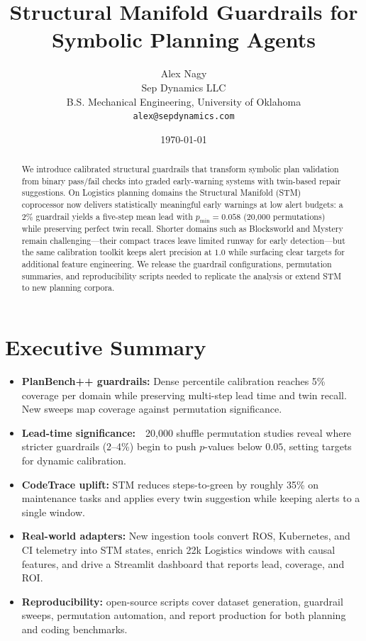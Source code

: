 \documentclass[11pt]{article}
\title{Structural Manifold Guardrails for Symbolic Planning Agents}
\author{Alex Nagy\\Sep Dynamics LLC\\B.S. Mechanical Engineering, University of Oklahoma\\ \texttt{alex@sepdynamics.com}}
\date{\today}
\begin{document}
\maketitle

\begin{abstract}
We introduce calibrated structural guardrails that transform symbolic plan
validation from binary pass/fail checks into graded early-warning systems with
twin-based repair suggestions. On Logistics planning domains the Structural
Manifold (STM) coprocessor now delivers statistically meaningful early warnings at
low alert budgets: a 2\% guardrail yields a five-step mean lead with
$p_{\min}=0.058$ (20,000 permutations) while preserving perfect twin recall. Shorter
domains such as Blocksworld and Mystery remain challenging---their compact traces
leave limited runway for early detection---but the same calibration toolkit keeps
alert precision at $1.0$ while surfacing clear targets for additional feature
engineering. We release the guardrail configurations, permutation summaries, and
reproducibility scripts needed to replicate the analysis or extend STM to new
planning corpora.
\end{abstract}

\tableofcontents
\newpage

\section*{Executive Summary}
\begin{sloppypar}
\begin{itemize}
  \item \textbf{PlanBench++ guardrails:} Dense percentile calibration reaches 5\% coverage per domain while preserving multi-step lead time and twin recall. New sweeps map coverage against permutation significance.
  \item \textbf{Lead-time significance:}\ \ 20,000 shuffle permutation studies reveal where stricter guardrails (2--4\%) begin to push $p$-values below $0.05$, setting targets for dynamic calibration.
  \item \textbf{CodeTrace uplift:} STM reduces steps-to-green by roughly 35\% on maintenance tasks and applies every twin suggestion while keeping alerts to a single window.
  \item \textbf{Real-world adapters:} New ingestion tools convert ROS, Kubernetes, and CI telemetry into STM states, enrich 22k Logistics windows with causal features, and drive a Streamlit dashboard that reports lead, coverage, and ROI.
  \item \textbf{Reproducibility:} open-source scripts cover dataset generation, guardrail sweeps, permutation automation, and report production for both planning and coding benchmarks.
\end{itemize}
\end{sloppypar}
\end{document}

